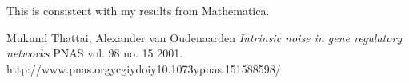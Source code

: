 \documentclass[oneside]{labbook}
\begin{document}
This is consistent with my results from Mathematica.

\begin{thebibliography}{2}
Mukund Thattai, Alexander van Oudenaarden
\emph{Intrinsic noise in gene regulatory networks}
PNAS vol. 98 no. 15
2001.
http://www.pnas.orgycgiydoiy10.1073ypnas.151588598/
\end{thebibliography}
\end{document}
